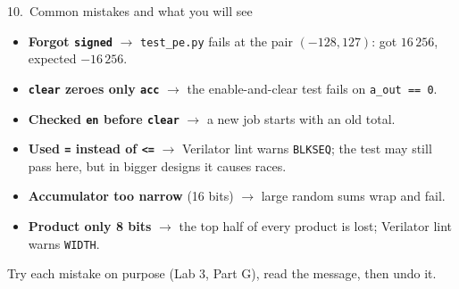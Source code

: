 \documentclass[aspectratio=169,11pt]{beamer}
\newcommand{\sig}[1]{\texttt{#1}}
\begin{document}
\begin{frame}{10.\ Common mistakes and what you will see}
  \small
  \begin{itemize}
    \item \textbf{Forgot \sig{signed}} $\rightarrow$ \sig{test\_pe.py} fails at the pair $(-128, 127)$:
          got $16\,256$, expected $-16\,256$.
    \item \textbf{\sig{clear} zeroes only \sig{acc}} $\rightarrow$ the enable-and-clear test fails on
          \sig{a\_out == 0}.
    \item \textbf{Checked \sig{en} before \sig{clear}} $\rightarrow$ a new job starts with an old total.
    \item \textbf{Used \sig{=} instead of \sig{<=}} $\rightarrow$ Verilator lint warns \sig{BLKSEQ};
          the test may still pass here, but in bigger designs it causes races.
    \item \textbf{Accumulator too narrow} (16 bits) $\rightarrow$ large random sums wrap and fail.
    \item \textbf{Product only 8 bits} $\rightarrow$ the top half of every product is lost; Verilator
          lint warns \sig{WIDTH}.
  \end{itemize}
  \vspace{2mm}
  \footnotesize\color{muted} Try each mistake on purpose (Lab 3, Part G), read the message, then undo it.
\end{frame}
\end{document}
